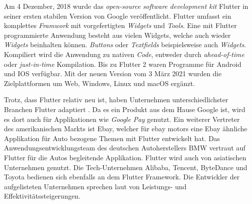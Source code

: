 Am 4 Dezember, 2018 wurde das \textit{open-source software development kit} Flutter in seiner ersten stabilen Version von Google veröffentlicht. Flutter umfasst ein komplettes \textit{Framwork} mit vorgefertigten \textit{Widgets} und \textit{Tools}. Eine mit Flutter programmierte Anwendung besteht aus vielen Widgets, welche auch wieder \textit{Widgets} beinhalten können. \textit{Buttons} oder \textit{Textfields} beispielsweise auch \textit{Widgets}. Kompiliert wird die Anwendung zu nativen \textit{Code}, entweder durch \textit{ahead-of-time} oder \textit{just-in-time} Kompilation. Bis zu Flutter 2 waren Programme für Android und IOS verfügbar. Mit der neuen Version vom 3 März 2021 wurden die Zielplattformen um Web, Windows, Linux und macOS ergänzt.

Trotz, dass Flutter relativ neu ist, haben Unternehmen unterschiedlichster Branchen Flutter adaptiert \cite{Flutter:Usage}. Da es ein Produkt aus dem Hause Google ist, wird es dort auch für Applikationen wie \textit{Google Pay} genutzt. Ein weiterer Vertreter des amerikanischen Markts ist Ebay, welcher für ebay motors eine Ebay ähnliche Applikation für Auto bezogene Themen mit Flutter entwickelt hat. Das Anwendungsentwicklungsteam des deutschen Autoherstellers BMW vertraut auf Flutter für die Autos begleitende Applikation. Flutter wird auch von asiatischen Unternehmen genutzt. Die Tech-Unternehmen Alibaba, Tencent, ByteDance und Toyota bedienen sich ebenfalls an dem Flutter Framework. Die Entwickler der aufgelisteten Unternehmen sprechen laut \cite{Flutter:Usage} von Leistungs- und Effektivitätssteigerungen. 
